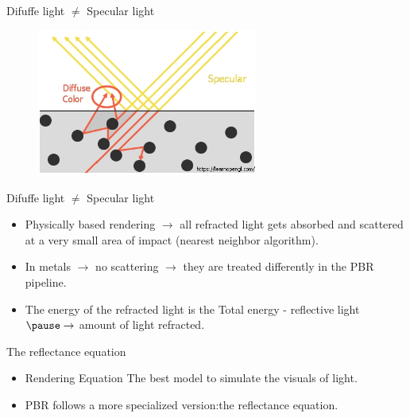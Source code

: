 \documentclass[]{beamer}
\begin{document}
\begin{frame}


  \textcolor{mypink1}{Difuffe light $\neq$ Specular light} 
\vspace{5mm}

\begin{figure}[h!]
  \begin{center}
    \includegraphics[height=1.9in]{images/17.jpg}
  \end{center}
\end{figure}



\end{frame}


\begin{frame}


  \textcolor{mypink1}{Difuffe light $\neq$ Specular light} 
\vspace{5mm}
\pause

\begin{itemize}
  \item Physically based rendering \pause $\rightarrow$ all refracted light gets absorbed and scattered at a very small area of impact (nearest neighbor algorithm).\pause
  \item In metals \pause $\rightarrow$ no scattering  \pause $\rightarrow$  they are treated differently in the PBR pipeline.\pause
  \item The energy of the refracted light is the Total energy - reflective light$\pause \rightarrow$ amount of light refracted.
\end{itemize}


\end{frame}


\begin{frame}


  \textcolor{mypink1}{The reflectance equation} 
\vspace{5mm}
\pause

\begin{itemize}
  \item Rendering Equation \pause The best model to simulate the visuals of light.
  \item PBR follows a more specialized version:\pause the reflectance equation.
\end{itemize}



\end{frame}
\end{document}
